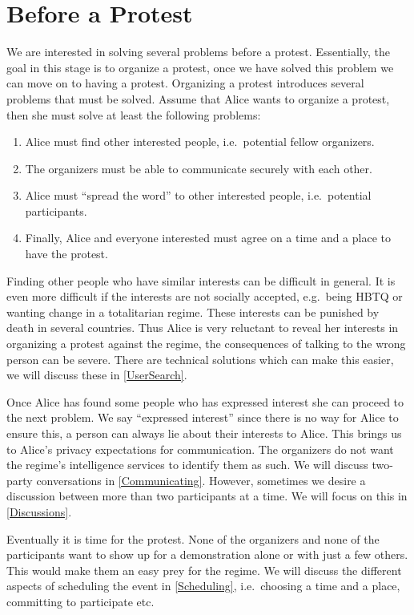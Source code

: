 \section{Before a Protest}
\label{BeforeProtest}

We are interested in solving several problems before a protest.
Essentially, the goal in this stage is to organize a protest, once we have 
solved this problem we can move on to having a protest.
Organizing a protest introduces several problems that must be solved.
Assume that Alice wants to organize a protest, then she must solve at least the 
following problems:
\begin{enumerate}
  \item Alice must find other interested people, i.e.\ potential fellow 
    organizers.
  \item The organizers must be able to communicate securely with each other.
  \item Alice must \enquote{spread the word} to other interested people, i.e.\ 
    potential participants.
  \item Finally, Alice and everyone interested must agree on a time and a place
    to have the protest.
\end{enumerate}

Finding other people who have similar interests can be difficult in general.
It is even more difficult if the interests are not socially accepted, e.g.\ 
being HBTQ or wanting change in a totalitarian regime.
These interests can be punished by death in several countries.
Thus Alice is very reluctant to reveal her interests in organizing a protest 
against the regime, the consequences of talking to the wrong person can be 
severe.
There are technical solutions which can make this easier, we will discuss these 
in \cref{UserSearch}.

Once Alice has found some people who has expressed interest she can proceed to 
the next problem.
We say \enquote{expressed interest} since there is no way for Alice to ensure 
this, a person can always lie about their interests to Alice.
This brings us to Alice's privacy expectations for communication.
The organizers do not want the regime's intelligence services to identify them 
as such.
We will discuss two-party conversations in \cref{Communicating}.
However, sometimes we desire a discussion between more than two participants at 
a time.
We will focus on this in \cref{Discussions}.

Eventually it is time for the protest.
None of the organizers and none of the participants want to show up for 
a demonstration alone or with just a few others.
This would make them an easy prey for the regime.
We will discuss the different aspects of scheduling the event in 
\cref{Scheduling}, i.e.\ choosing a time and a place, committing to participate 
etc.

